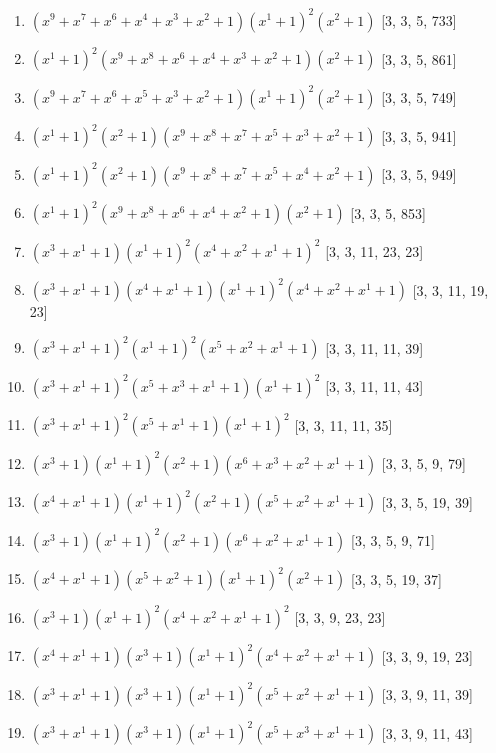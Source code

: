 \documentclass[10pt,twocolumn]{article}
\begin{document}
\begin{enumerate}
\item $(x^{9} + x^{7} + x^{6} + x^{4} + x^{3} + x^{2} + 1)(x^{1} + 1)^{2}(x^{2} + 1)$  [3, 3, 5, 733]
\item $(x^{1} + 1)^{2}(x^{9} + x^{8} + x^{6} + x^{4} + x^{3} + x^{2} + 1)(x^{2} + 1)$  [3, 3, 5, 861]
\item $(x^{9} + x^{7} + x^{6} + x^{5} + x^{3} + x^{2} + 1)(x^{1} + 1)^{2}(x^{2} + 1)$  [3, 3, 5, 749]
\item $(x^{1} + 1)^{2}(x^{2} + 1)(x^{9} + x^{8} + x^{7} + x^{5} + x^{3} + x^{2} + 1)$  [3, 3, 5, 941]
\item $(x^{1} + 1)^{2}(x^{2} + 1)(x^{9} + x^{8} + x^{7} + x^{5} + x^{4} + x^{2} + 1)$  [3, 3, 5, 949]
\item $(x^{1} + 1)^{2}(x^{9} + x^{8} + x^{6} + x^{4} + x^{2} + 1)(x^{2} + 1)$  [3, 3, 5, 853]
\item $(x^{3} + x^{1} + 1)(x^{1} + 1)^{2}(x^{4} + x^{2} + x^{1} + 1)^{2}$  [3, 3, 11, 23, 23]
\item $(x^{3} + x^{1} + 1)(x^{4} + x^{1} + 1)(x^{1} + 1)^{2}(x^{4} + x^{2} + x^{1} + 1)$  [3, 3, 11, 19, 23]
\item $(x^{3} + x^{1} + 1)^{2}(x^{1} + 1)^{2}(x^{5} + x^{2} + x^{1} + 1)$  [3, 3, 11, 11, 39]
\item $(x^{3} + x^{1} + 1)^{2}(x^{5} + x^{3} + x^{1} + 1)(x^{1} + 1)^{2}$  [3, 3, 11, 11, 43]
\item $(x^{3} + x^{1} + 1)^{2}(x^{5} + x^{1} + 1)(x^{1} + 1)^{2}$  [3, 3, 11, 11, 35]
\item $(x^{3} + 1)(x^{1} + 1)^{2}(x^{2} + 1)(x^{6} + x^{3} + x^{2} + x^{1} + 1)$  [3, 3, 5, 9, 79]
\item $(x^{4} + x^{1} + 1)(x^{1} + 1)^{2}(x^{2} + 1)(x^{5} + x^{2} + x^{1} + 1)$  [3, 3, 5, 19, 39]
\item $(x^{3} + 1)(x^{1} + 1)^{2}(x^{2} + 1)(x^{6} + x^{2} + x^{1} + 1)$  [3, 3, 5, 9, 71]
\item $(x^{4} + x^{1} + 1)(x^{5} + x^{2} + 1)(x^{1} + 1)^{2}(x^{2} + 1)$  [3, 3, 5, 19, 37]
\item $(x^{3} + 1)(x^{1} + 1)^{2}(x^{4} + x^{2} + x^{1} + 1)^{2}$  [3, 3, 9, 23, 23]
\item $(x^{4} + x^{1} + 1)(x^{3} + 1)(x^{1} + 1)^{2}(x^{4} + x^{2} + x^{1} + 1)$  [3, 3, 9, 19, 23]
\item $(x^{3} + x^{1} + 1)(x^{3} + 1)(x^{1} + 1)^{2}(x^{5} + x^{2} + x^{1} + 1)$  [3, 3, 9, 11, 39]
\item $(x^{3} + x^{1} + 1)(x^{3} + 1)(x^{1} + 1)^{2}(x^{5} + x^{3} + x^{1} + 1)$  [3, 3, 9, 11, 43]

\end{enumerate}
\end{document}
